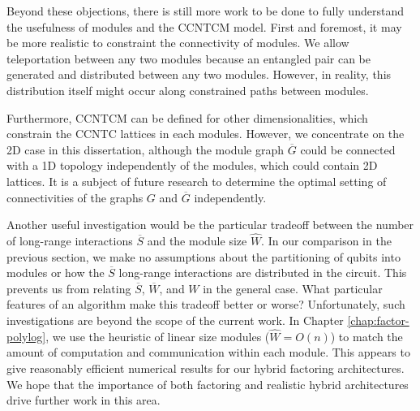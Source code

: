 Beyond these objections, there is still more work to be done to fully
understand the usefulness of modules and the \textsf{CCNTCM} model.
First and foremost, it may be more realistic to constraint the
connectivity of modules. We allow teleportation between any two modules
because an entangled pair can be generated and distributed between any
two modules. However, in reality, this distribution itself might occur along
constrained paths between modules.

Furthermore, \textsf{CCNTCM} can be defined for other dimensionalities,
which constrain the \textsf{CCNTC} lattices in each modules.
However, we concentrate on the \textsf{2D} case in this dissertation,
although the module graph $\overline{G}$ could be connected with
a \textsc{1D} topology independently of the modules, which could contain
\textsc{2D} lattices. It is a subject of future research to determine
the optimal setting of connectivities of the graphs $G$
and $\overline{G}$ independently.

Another useful investigation would be
the particular tradeoff between the number of
long-range interactions $\overline{S}$ and the module size $\hat{W}$.
In our comparison in the previous section, we make no assumptions about the 
partitioning of qubits into
modules or how the $\overline{S}$ long-range interactions are distributed
in the circuit. This prevents us from relating $\overline{S}$,
$\overline{W}$, and $W$ in the general case.
What particular features of an algorithm make this tradeoff better or worse?
Unfortunately, such investigations are beyond the scope of the current
work. In Chapter \ref{chap:factor-polylog}, we use the heuristic of linear 
size modules ($\hat{W} = O(n)$) to match the amount of computation and
communication within each module. This appears to give reasonably efficient
numerical results for our hybrid factoring architectures. We hope that
the importance of
both factoring and realistic hybrid architectures drive further work in this
area.

